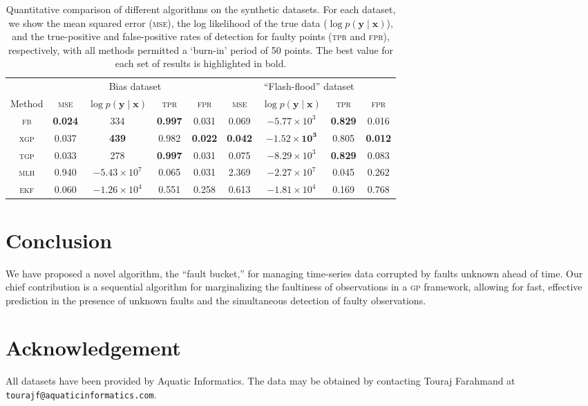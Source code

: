 \documentclass{article}
\newcommand{\given}{\ensuremath{\mid}}
\newcommand{\bm}[1]{\ensuremath{\mathbf{#1}}}
\newcommand{\acro}[1]{\textsc{#1}}
\begin{document}
\begin{table}
  \begin{center}
  \caption{Quantitative comparison of different algorithms on the
    synthetic datasets.  For each dataset, we show the mean squared error
    (\textsc{mse}), the log likelihood of the true data ($\log p(\bm{y}
    \given \bm{x})$), and the true-positive and false-positive rates
    of detection for faulty points (\textsc{tpr} and \textsc{fpr}),
    respectively, with all methods permitted a `burn-in' period of 50 points. The best value for each set of results is highlighted in
    bold.}
  \label{tbl:results}
  \begin{tabular}{ccccccccc}
    \toprule
& \multicolumn{4}{c}{Bias dataset} & \multicolumn{4}{c}{``Flash-flood'' dataset}\\
    \cmidrule(l){2-5} \cmidrule(l){6-9}
    Method & \scshape{mse} & $\log p(\bm{y}\given\bm{x})$ & \scshape{tpr} & \scshape{fpr} 
& \scshape{mse} & $\log p(\bm{y}\given\bm{x})$ & \scshape{tpr} & \scshape{fpr} \\
\midrule
    \scshape{fb} & \textbf{0.024} & 334 & \textbf{0.997} & 0.031 & 0.069 & $-5.77\times 10^3$ & \textbf{0.829} & {0.016} \\
    \scshape{xgp} & 0.037 & \textbf{439} & 0.982 & \textbf{0.022} & \textbf{0.042} & $\mathbf{-1.52 \times 10^3}$ & 0.805 & \textbf{0.012} \\
    \scshape{tgp} & 0.033 & 278 & \textbf{0.997} & 0.031 & 0.075 & $-8.29\times 10^3$ & \textbf{0.829} & 0.083 \\
    \scshape{mlh} & 0.940 & $-5.43\times 10^7$ & 0.065 & 0.031 & 2.369 & $-2.27\times 10^7$ & 0.045 & 0.262 \\
   \scshape{ekf} & 0.060 & $-1.26 \times 10^4$ & 0.551 & 0.258 & 0.613 & $-1.81\times 10^4$ & 0.169 & 0.768 \\
    \bottomrule
  \end{tabular}
  \end{center}
\end{table}


\section{Conclusion}
We have proposed a novel algorithm, the ``fault bucket,'' for managing
time-series data corrupted by faults unknown ahead of time. Our chief
contribution is a sequential algorithm for marginalizing the
faultiness of observations in a \acro{gp} framework, allowing for
fast, effective prediction in the presence of unknown faults and the
simultaneous detection of faulty observations.

\section*{Acknowledgement}
All datasets have been provided by Aquatic Informatics. The data may
be obtained by contacting Touraj Farahmand at
\texttt{tourajf@aquaticinformatics.com}.




\end{document}
